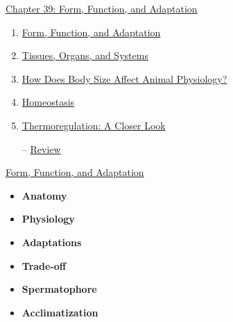 \documentclass[12pt,letterpaper]{article}
\newcommand{\thetitle}{\hypertarget{home}{Animals and Ecology}}
\begin{document}



\clearpage

\renewcommand{\thetitle}{\hypertarget{39}{Form, Function, and Adaptation}}
\hypertarget{39}{} 

\begin{chapbox}{\hyperlink{home}{Chapter 39: Form, Function, and Adaptation}}
    \begin{enumerate}
        \item \hyperlink{39.1}{Form, Function, and Adaptation}
        \item \hyperlink{39.2}{Tissues, Organs, and Systems}
        \item \hyperlink{39.3}{How Does Body Size Affect Animal Physiology?}
        \item \hyperlink{39.4}{Homeostasis}
        \item \hyperlink{39.5}{Thermoregulation: A Closer Look}
        \item [--] \hyperlink{39.r}{Review}
    \end{enumerate}
\end{chapbox}

\hypertarget{39.1}{}
\begin{secbox}{\hyperlink{39}{Form, Function, and Adaptation}}{
    \begin{itemize}
        \item\textbf{Anatomy}
        \item\textbf{Physiology}
        \item\textbf{Adaptations}
        \item\textbf{Trade-off}
        \item\textbf{Spermatophore}
        \item\textbf{Acclimatization}
    \end{itemize}    
}\end{secbox}
\end{document}
